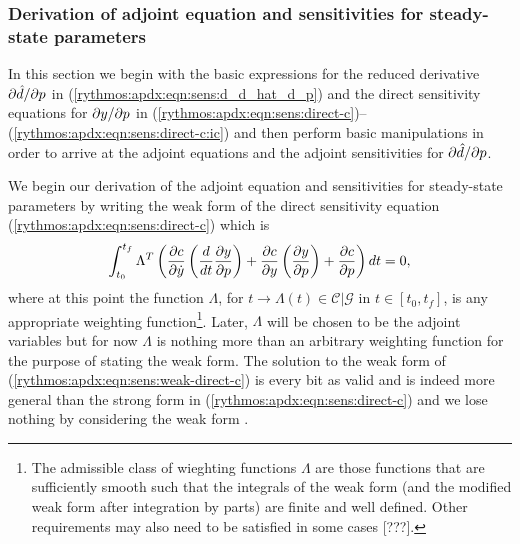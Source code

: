 \documentclass[pdf,ps2pdf,11pt]{SANDreport}
\begin{document}
\subsubsection{Derivation of adjoint equation and sensitivities for steady-state parameters}
\label{rythmos:app:adj-equ-derivation}

In this section we begin with the basic expressions for the reduced
derivative $\partial \hat{d} / \partial p$ in (\ref{rythmos:apdx:eqn:sens:d_d_hat_d_p}) and
the direct sensitivity equations for $\partial y / \partial p$ in
(\ref{rythmos:apdx:eqn:sens:direct-c})--(\ref{rythmos:apdx:eqn:sens:direct-c:ic})
and then perform basic manipulations in order to arrive at the adjoint
equations and the adjoint sensitivities for $\partial \hat{d} / \partial p$.

We begin our derivation of the adjoint equation and sensitivities for
steady-state parameters by writing the weak form of the direct sensitivity
equation (\ref{rythmos:apdx:eqn:sens:direct-c}) which is
%
\begin{equation}
\int_{t_0}^{t_f} \Lambda^T \left(
\displaystyle{\frac{\partial c}{\partial \dot{y}}} \left(\frac{d}{dt} \displaystyle{\frac{\partial y}{\partial p}} \right)
+ \displaystyle{\frac{\partial c}{\partial y}} \left(\displaystyle{\frac{\partial y}{\partial p}}\right)
+ \displaystyle{\frac{\partial c}{\partial p}}
\right) dt = 0,
\label{rythmos:apdx:eqn:sens:weak-direct-c}
\end{equation}
%
where at this point the function $\Lambda$, for
$t\rightarrow\Lambda(t)\in\mathcal{C}|\mathcal{G}$ in $t\in[t_0,t_f]$, is any
appropriate weighting function\footnote{The admissible class of wieghting
functions $\Lambda$ are those functions that are sufficiently smooth such that
the integrals of the weak form (and the modified weak form after integration
by parts) are finite and well defined.  Other requirements may also need to be
satisfied in some cases [???].}.  Later, $\Lambda$ will be chosen to be the
adjoint variables but for now $\Lambda$ is nothing more than an arbitrary
weighting function for the purpose of stating the weak form.  The solution to
the weak form of (\ref{rythmos:apdx:eqn:sens:weak-direct-c}) is every bit as
valid and is indeed more general than the strong form in
(\ref{rythmos:apdx:eqn:sens:direct-c}) and we lose nothing by considering the
weak form {}\cite{BeckerCareyOden-FE}.
\end{document}
